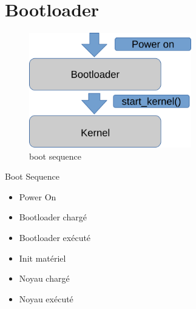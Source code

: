 \section{Bootloader}
\begin{frame}
	\begin{minipage}[t]{0.45\linewidth}
		\begin{figure}
			\includegraphics[height=5cm]{img/boot_bl_kern.png}
			\caption{boot sequence}
		\end{figure}

	\end{minipage}

	\begin{minipage}[t]{0.45\linewidth}
	\begin{block}{Boot Sequence}
		\begin{itemize}
			\item<1-> Power On
			\item<2-> Bootloader chargé
			\item<3-> Bootloader exécuté
			\item<4-> Init matériel
			\item<5-> Noyau chargé
			\item<6-> Noyau exécuté
		\end{itemize}
	\end{block}
	\end{minipage}
\end{frame}
\begin{frame}

\end{frame}

\begin{frame}
\end{frame}

